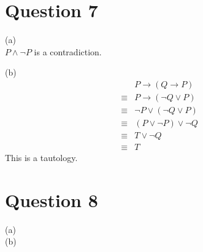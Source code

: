\documentclass{article}
\begin{document}
\section*{Question 7}
(a) \\
$P \land \neg P$ is a contradiction.

\vspace{0.5cm}
\noindent
(b) \\
\begin{align*}
    &P \rightarrow (Q \rightarrow P) \\
    \equiv &P \rightarrow (\neg Q \lor P) \\
    \equiv &\neg P \lor (\neg Q \lor P) \\
    \equiv &(P \lor \neg P) \lor \neg Q \\
    \equiv &T \lor \neg Q \\
    \equiv &T
\end{align*}
This is a tautology.

\section*{Question 8}
(a) \\
(b) \\
\end{document}
